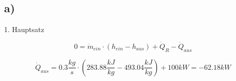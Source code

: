 

\subsection*{a)}
1. Hauptsatz

\[
0 = \dot{m}_{ein} \cdot (h_{ein} - h_{aus}) + \dot{Q}_R - \dot{Q}_{aus}
\]

\[
\dot{Q}_{aus} = 0.3 \frac{kg}{s} \cdot \left( 283.88 \frac{kJ}{kg} - 493.04 \frac{kJ}{kg} \right) + 100 kW = -62.18 kW
\]